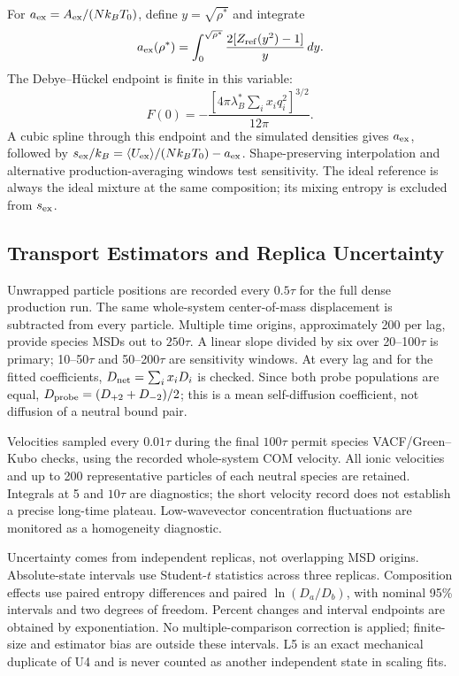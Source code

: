 For $a_{\rm ex}=A_{\rm ex}/(Nk_BT_0)$, define $y=\sqrt{\rho^*}$ and integrate
\begin{equation}
a_{\rm ex}(\rho^*)=\int_0^{\sqrt{\rho^*}}\frac{2[Z_{\rm ref}(y^2)-1]}{y}\,dy.
\label{eq:new_ti}
\end{equation}
The Debye--H\"uckel endpoint is finite in this variable:
\begin{equation}
F(0)=-\frac{[4\pi\lambda_B^*\sum_i x_iq_i^2]^{3/2}}{12\pi}.
\label{eq:new_endpoint}
\end{equation}
A cubic spline through this endpoint and the simulated densities gives $a_{\rm ex}$, followed by $s_{\rm ex}/k_B=\langle U_{\rm ex}\rangle/(Nk_BT_0)-a_{\rm ex}$. Shape-preserving interpolation and alternative production-averaging windows test sensitivity. The ideal reference is always the ideal mixture at the same composition; its mixing entropy is excluded from $s_{\rm ex}$.

\subsection{Transport Estimators and Replica Uncertainty}

Unwrapped particle positions are recorded every $0.5\tau$ for the full dense production run. The same whole-system center-of-mass displacement is subtracted from every particle. Multiple time origins, approximately 200 per lag, provide species MSDs out to $250\tau$. A linear slope divided by six over 20--100$\tau$ is primary; 10--50$\tau$ and 50--200$\tau$ are sensitivity windows. At every lag and for the fitted coefficients, $D_{\rm net}=\sum_i x_iD_i$ is checked. Since both probe populations are equal, $D_{\rm probe}=(D_{+2}+D_{-2})/2$; this is a mean self-diffusion coefficient, not diffusion of a neutral bound pair.

Velocities sampled every $0.01\tau$ during the final $100\tau$ permit species VACF/Green--Kubo checks, using the recorded whole-system COM velocity. All ionic velocities and up to 200 representative particles of each neutral species are retained. Integrals at 5 and $10\tau$ are diagnostics; the short velocity record does not establish a precise long-time plateau. Low-wavevector concentration fluctuations are monitored as a homogeneity diagnostic.

Uncertainty comes from independent replicas, not overlapping MSD origins. Absolute-state intervals use Student-$t$ statistics across three replicas. Composition effects use paired entropy differences and paired $\ln(D_a/D_b)$, with nominal 95\% intervals and two degrees of freedom. Percent changes and interval endpoints are obtained by exponentiation. No multiple-comparison correction is applied; finite-size and estimator bias are outside these intervals. L5 is an exact mechanical duplicate of U4 and is never counted as another independent state in scaling fits.
